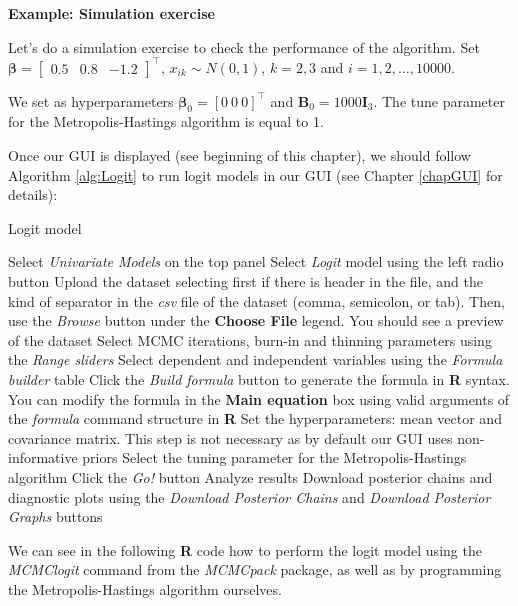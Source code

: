 \textbf{Example: Simulation exercise}

Let's do a simulation exercise to check the performance of the algorithm. Set $\bm{\beta}=\begin{bmatrix}0.5 & 0.8 & -1.2\end{bmatrix}^{\top}$, $x_{ik}\sim N(0,1)$, $k=2,3$ and $i=1,2,\dots,10000$.

We set as hyperparameters $\bm{\beta}_0=[0 \ 0 \ 0]^{\top}$ and ${\bm{B}}_0=1000{\bm{I}}_3$. The tune parameter for the Metropolis-Hastings algorithm is equal to 1.

Once our GUI is displayed (see beginning of this chapter), we should follow Algorithm \ref{alg:Logit} to run logit models in our GUI (see Chapter \ref{chapGUI} for details):
\begin{algorithm}[h!]
	\caption{Logit model}\label{alg:Logit}
	\begin{algorithmic}[1]  		 			
		\State Select \textit{Univariate Models} on the top panel
		\State Select \textit{Logit} model using the left radio button
		\State Upload the dataset selecting first if there is header in the file, and the kind of separator in the \textit{csv} file of the dataset (comma, semicolon, or tab). Then, use the \textit{Browse} button under the \textbf{Choose File} legend. You should see a preview of the dataset
		\State Select MCMC iterations, burn-in and thinning parameters using the \textit{Range sliders}
		\State Select dependent and independent variables using the \textit{Formula builder} table
		\State Click the \textit{Build formula} button to generate the formula in \textbf{R} syntax. You can modify the formula in the \textbf{Main equation} box using valid arguments of the \textit{formula} command structure in \textbf{R}
		\State Set the hyperparameters: mean vector and covariance matrix. This step is not necessary as by default our GUI uses non-informative priors
		\State Select the tuning parameter for the Metropolis-Hastings algorithm
		\State Click the \textit{Go!} button
		\State Analyze results
		\State Download posterior chains and diagnostic plots using the \textit{Download Posterior Chains} and \textit{Download Posterior Graphs} buttons
	\end{algorithmic} 
\end{algorithm}

We can see in the following \textbf{R} code how to perform the logit model using the \textit{MCMClogit} command from the \textit{MCMCpack} package, as well as by programming the Metropolis-Hastings algorithm ourselves. 

